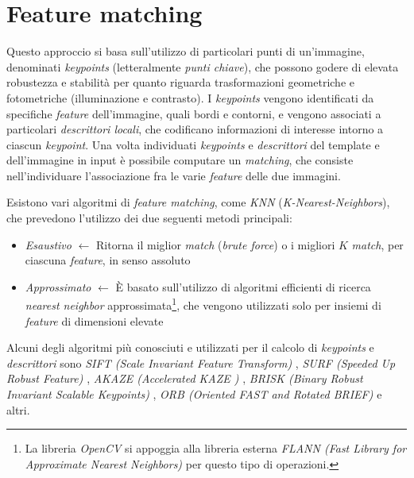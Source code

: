 \section{Feature matching}
\label{sec:feature-matching}
Questo approccio si basa sull'utilizzo di particolari punti di un'immagine, denominati \textit{keypoints} (letteralmente \textit{punti chiave}), che possono godere di elevata robustezza e stabilit\`a per quanto riguarda trasformazioni geometriche e fotometriche (illuminazione e contrasto). I \textit{keypoints} vengono identificati da specifiche \textit{feature} dell'immagine, quali bordi e contorni, e vengono associati a particolari \textit{descrittori locali}, che codificano informazioni di interesse intorno a ciascun \textit{keypoint}. Una volta individuati \textit{keypoints} e \textit{descrittori} del template e dell'immagine in input \`e possibile computare un \textit{matching}, che consiste nell'individuare l'associazione fra le varie \textit{feature} delle due immagini.\par
Esistono vari algoritmi di \textit{feature matching}, come \textit{KNN} (\textit{K-Nearest-Neighbors}), che prevedono l'utilizzo dei due seguenti metodi principali:
\begin{itemize}
	\item \textit{Esaustivo} $\gets$ Ritorna il miglior \textit{match} (\textit{brute force}) o i migliori $K$ \textit{match}, per ciascuna \textit{feature}, in senso assoluto
	\item \textit{Approssimato} $\gets$ \`E basato sull'utilizzo di algoritmi efficienti di ricerca \textit{nearest neighbor} approssimata\footnote{La libreria \textit{OpenCV} si appoggia alla libreria esterna \textit{FLANN (Fast Library for Approximate Nearest Neighbors)} per questo tipo di operazioni.}, che vengono utilizzati solo per insiemi di \textit{feature} di dimensioni elevate 
\end{itemize}\par
Alcuni degli algoritmi pi\`u conosciuti e utilizzati per il calcolo di \textit{keypoints} e \textit{descrittori} sono \textit{SIFT (Scale Invariant Feature Transform)} \cite{bib:sift}, \textit{SURF (Speeded Up Robust Feature)} \cite{bib:surf}, \textit{AKAZE (Accelerated KAZE \cite{bib:kaze})} \cite{bib:akaze}, \textit{BRISK (Binary Robust Invariant Scalable Keypoints)} \cite{bib:brisk}, \textit{ORB (Oriented FAST and Rotated BRIEF)} \cite{bib:orb} e altri.



